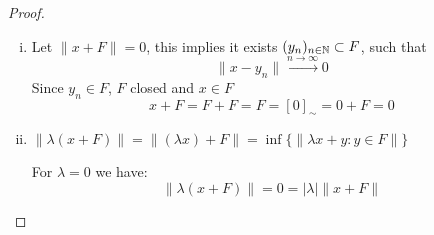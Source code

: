 \begin{proof}
	\begin{enumerate}[(i)]
		\item Let $\|x + F\| = 0$, this implies it exists $(y_{n})_{n \in \mathbb{N}} \subset F$, such that 
			\begin{equation*}
				\| x - y_n \| \xrightarrow{n \to \infty} 0
			\end{equation*}
			Since $y_n \in F$, $F$ closed and $x \in F$
			\begin{equation*}
				x + F = F + F = F = [0]_{\sim} = 0 + F = 0
			\end{equation*}
		\item $\|\lambda (x + F)\| = \| (\lambda x ) + F\| = \inf\{\|\lambda x + y : y \in F\|\}$

			For $\lambda = 0$ we have:
			\begin{equation*}
				\| \lambda (x + F) \| = 0 = |\lambda| \|x + F \|
			\end{equation*}


\end{enumerate}
\end{proof}
